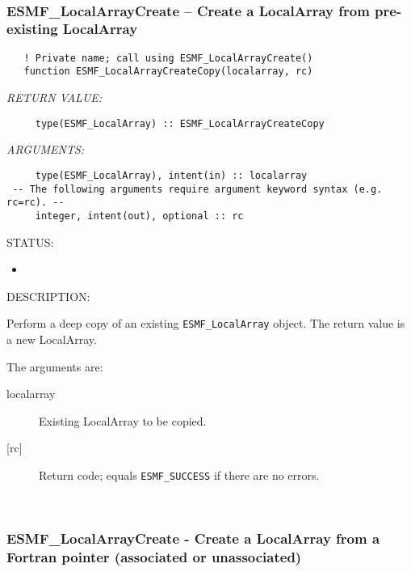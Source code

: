  
\mbox{}\hrulefill\ 
 
\subsubsection [ESMF\_LocalArrayCreate] {ESMF\_LocalArrayCreate -- Create a LocalArray from pre-existing LocalArray}


\begin{verbatim}   ! Private name; call using ESMF_LocalArrayCreate()
   function ESMF_LocalArrayCreateCopy(localarray, rc)\end{verbatim}{\em RETURN VALUE:}
\begin{verbatim}     type(ESMF_LocalArray) :: ESMF_LocalArrayCreateCopy\end{verbatim}{\em ARGUMENTS:}
\begin{verbatim}     type(ESMF_LocalArray), intent(in) :: localarray
 -- The following arguments require argument keyword syntax (e.g. rc=rc). --
     integer, intent(out), optional :: rc\end{verbatim}
{\sf STATUS:}
   \begin{itemize}
   \item{}
   \end{itemize}
  
{\sf DESCRIPTION:\\ }


   Perform a deep copy of an existing {\tt ESMF\_LocalArray} object. The return
   value is a new LocalArray.
  
   The arguments are:
   \begin{description}
   \item[localarray]
   Existing LocalArray to be copied.
   \item[{[rc]}]
   Return code; equals {\tt ESMF\_SUCCESS} if there are no errors.
   \end{description}
   
 
\mbox{}\hrulefill\ 
 
\subsubsection [ESMF\_LocalArrayCreate] {ESMF\_LocalArrayCreate - Create a LocalArray from a Fortran pointer (associated or unassociated) }


